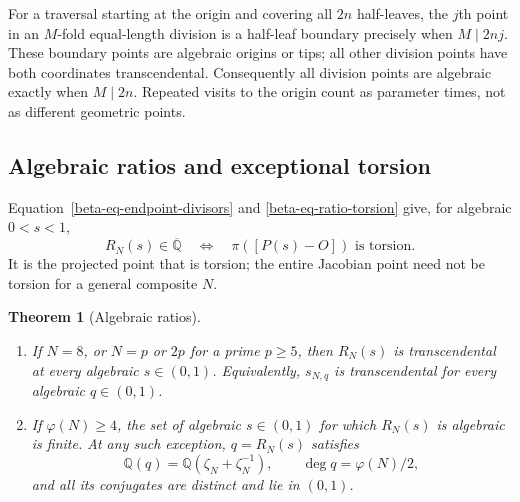 \documentclass[11pt,a4paper]{article}
\newtheorem{theorem}{Theorem}[section]
\theoremstyle{definition}
\theoremstyle{remark}
\numberwithin{equation}{section}
\begin{document}
For a traversal starting at the origin and covering all $2n$ half-leaves,
the $j$th point in an $M$-fold equal-length division is a half-leaf
boundary precisely when $M\mid2nj$.  These boundary points are algebraic
origins or tips; all other division points have both coordinates
transcendental.  Consequently all division points are algebraic exactly
when $M\mid2n$.  Repeated visits to the origin count as parameter times,
not as different geometric points.

\subsection{Algebraic ratios and exceptional torsion}

Equation~\eqref{beta-eq-endpoint-divisors} and
\eqref{beta-eq-ratio-torsion} give, for algebraic $0<s<1$,
\begin{equation}\label{beta-eq-projected-torsion}
R_N(s)\in\overline{\mathbb Q}
\quad\Longleftrightarrow\quad
\pi([P(s)-O])\text{ is torsion}.
\end{equation}
It is the projected point that is torsion; the entire Jacobian point
need not be torsion for a general composite $N$.

\begin{theorem}[Algebraic ratios]\label{beta-thm-algebraic-ratios}
\begin{enumerate}
\item If $N=8$, or $N=p$ or $2p$ for a prime $p\ge5$, then $R_N(s)$ is
transcendental at every algebraic $s\in(0,1)$.  Equivalently,
$s_{N,q}$ is transcendental for every algebraic $q\in(0,1)$.
\item If $\varphi(N)\ge4$, the set of algebraic $s\in(0,1)$ for which
$R_N(s)$ is algebraic is finite.  At any such exception, $q=R_N(s)$
satisfies
\[
\mathbb Q(q)=\mathbb Q(\zeta_N+\zeta_N^{-1}),\qquad
\deg q=\varphi(N)/2,
\]
and all its conjugates are distinct and lie in $(0,1)$.
\end{enumerate}
\end{theorem}
\end{document}
